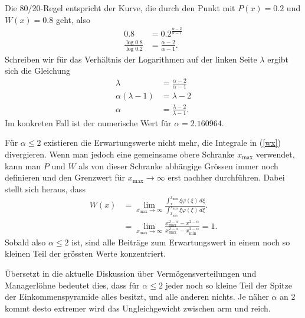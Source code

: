 Die 80/20-Regel entspricht der Kurve, die durch den 
Punkt mit $P(x)=0.2$ und $W(x)=0.8$ geht, also
\begin{align*}
0.8&=0.2^{\frac{\alpha-2}{\alpha-1}}
\\
\frac{\log 0.8}{\log 0.2}
&=
\frac{\alpha-2}{\alpha-1}.
\end{align*}
Schreiben wir für das Verhältnis der Logarithmen auf der linken
Seite $\lambda$ ergibt sich die Gleichung
\begin{align*}
\lambda
&=
\frac{\alpha-2}{\alpha-1}
\\
\alpha(\lambda-1)&=\lambda-2
\\
\alpha&=\frac{\lambda-2}{\lambda-1}.
\end{align*}
Im konkreten Fall ist der numerische Wert für $\alpha=2.160964$.

Für $\alpha\le 2$ existieren die Erwartungswerte nicht mehr, die
Integrale in (\ref{wx}) divergieren.
Wenn man jedoch
eine gemeinsame obere Schranke $x_{\max}$ verwendet, kann man $P$
und $W$ als von dieser Schranke abhängige Grössen immer noch
definieren und den Grenzwert für $x_{\max}\to\infty$ erst nachher
durchführen.
Dabei stellt sich heraus, dass
\begin{align*}
W(x)
&=
\lim_{x_{\max}\to\infty}
\frac%
{\int_x^{x_{\max}} \xi\varphi(\xi)\,d\xi}%
{\int_{x_{\min}}^{x_{\max}} \xi\varphi(\xi)\,d\xi}.
\\
&=
\lim_{x_{\max}\to\infty}
\frac%
{x_{\max}^{2-\alpha}-x^{2-\alpha}}%
{x_{\max}^{2-\alpha}-x_{\min}^{2-\alpha}}
=1.
\end{align*}
Sobald also $\alpha\le2$ ist, sind alle Beiträge zum Erwartungswert
in einem noch so kleinen Teil der grössten Werte konzentriert.

Übersetzt in die aktuelle Diskussion über Vermögensverteilungen
und Managerlöhne bedeutet dies, dass für $\alpha\le2$ jeder noch so
kleine Teil der Spitze der Einkommenspyramide alles besitzt, und alle
anderen nichts.
Je näher $\alpha$ an $2$ kommt desto extremer wird
das Ungleichgewicht zwischen arm und reich.

